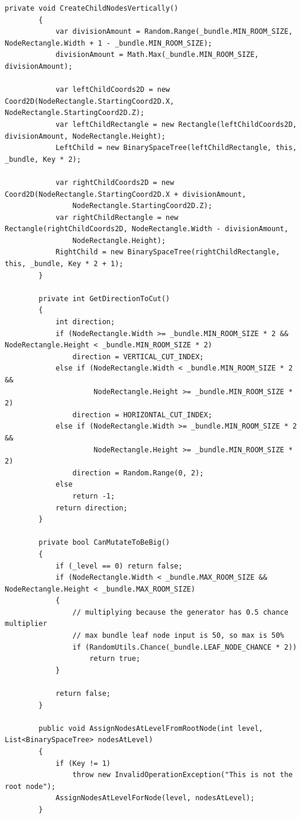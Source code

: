 \begin{lstlisting}[language={[Sharp]C}, frame=single, caption=BinarySpaceTree хэрэгжүүлэлт]
        private void CreateChildNodesVertically()
        {
            var divisionAmount = Random.Range(_bundle.MIN_ROOM_SIZE, NodeRectangle.Width + 1 - _bundle.MIN_ROOM_SIZE);
            divisionAmount = Math.Max(_bundle.MIN_ROOM_SIZE, divisionAmount);

            var leftChildCoords2D = new Coord2D(NodeRectangle.StartingCoord2D.X, NodeRectangle.StartingCoord2D.Z);
            var leftChildRectangle = new Rectangle(leftChildCoords2D, divisionAmount, NodeRectangle.Height);
            LeftChild = new BinarySpaceTree(leftChildRectangle, this, _bundle, Key * 2);

            var rightChildCoords2D = new Coord2D(NodeRectangle.StartingCoord2D.X + divisionAmount,
                NodeRectangle.StartingCoord2D.Z);
            var rightChildRectangle = new Rectangle(rightChildCoords2D, NodeRectangle.Width - divisionAmount,
                NodeRectangle.Height);
            RightChild = new BinarySpaceTree(rightChildRectangle, this, _bundle, Key * 2 + 1);
        }

        private int GetDirectionToCut()
        {
            int direction;
            if (NodeRectangle.Width >= _bundle.MIN_ROOM_SIZE * 2 && NodeRectangle.Height < _bundle.MIN_ROOM_SIZE * 2)
                direction = VERTICAL_CUT_INDEX;
            else if (NodeRectangle.Width < _bundle.MIN_ROOM_SIZE * 2 &&
                     NodeRectangle.Height >= _bundle.MIN_ROOM_SIZE * 2)
                direction = HORIZONTAL_CUT_INDEX;
            else if (NodeRectangle.Width >= _bundle.MIN_ROOM_SIZE * 2 &&
                     NodeRectangle.Height >= _bundle.MIN_ROOM_SIZE * 2)
                direction = Random.Range(0, 2);
            else
                return -1;
            return direction;
        }

        private bool CanMutateToBeBig()
        {
            if (_level == 0) return false;
            if (NodeRectangle.Width < _bundle.MAX_ROOM_SIZE && NodeRectangle.Height < _bundle.MAX_ROOM_SIZE)
            {
                // multiplying because the generator has 0.5 chance multiplier
                // max bundle leaf node input is 50, so max is 50%
                if (RandomUtils.Chance(_bundle.LEAF_NODE_CHANCE * 2))
                    return true;
            }

            return false;
        }

        public void AssignNodesAtLevelFromRootNode(int level, List<BinarySpaceTree> nodesAtLevel)
        {
            if (Key != 1)
                throw new InvalidOperationException("This is not the root node");
            AssignNodesAtLevelForNode(level, nodesAtLevel);
        }


\end{lstlisting}
